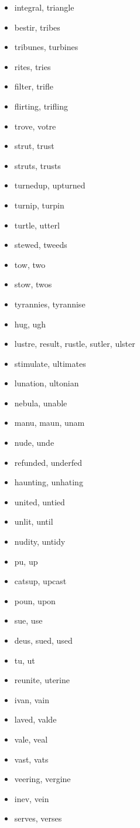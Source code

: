 \documentclass[a4wide,11pt]{report}
\begin{document}
\begin{itemize}
  \item integral, triangle
  \item bestir, tribes
  \item tribunes, turbines
  \item rites, tries
  \item filter, trifle
  \item flirting, trifling
  \item trove, votre
  \item strut, trust
  \item struts, trusts
  \item turnedup, upturned
  \item turnip, turpin
  \item turtle, utterl
  \item stewed, tweeds
  \item tow, two
  \item stow, twos
  \item tyrannies, tyrannise
  \item hug, ugh
  \item lustre, result, rustle, sutler, ulster
  \item stimulate, ultimates
  \item lunation, ultonian
  \item nebula, unable
  \item manu, maun, unam
  \item nude, unde
  \item refunded, underfed
  \item haunting, unhating
  \item united, untied
  \item unlit, until
  \item nudity, untidy
  \item pu, up
  \item catsup, upcast
  \item poun, upon
  \item sue, use
  \item deus, sued, used
  \item tu, ut
  \item reunite, uterine
  \item ivan, vain
  \item laved, valde
  \item vale, veal
  \item vast, vats
  \item veering, vergine
  \item inev, vein
  \item serves, verses

\end{itemize}
\end{document}

